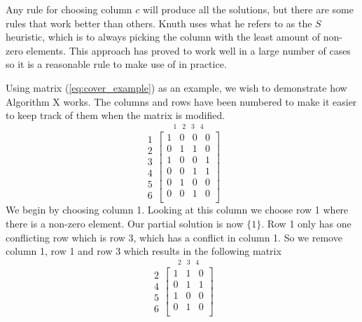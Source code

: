 Any rule for choosing column $c$ will produce all the solutions, but there are some rules that work better than others.
Knuth uses what he refers to as the $S$ heuristic, which is to always picking the column with the least amount of non-zero elements.
This approach has proved to work well in a large number of cases so it is a reasonable rule to make use of in practice.

Using matrix (\ref{eq:cover_example}) as an example, we wish to demonstrate how Algorithm X works.
The columns and rows have been numbered to make it easier to keep track of them when the matrix is modified.
\begin{equation}
	\label{eq:ces1}
	\begin{array}{r} 1\\ 2\\ 3\\ 4\\ 5\\ 6 \end{array}
	\stackrel{
		\begin{array}{cccc} 1 & 2 & 3 & 4 \end{array}
	}{
		\begin{bmatrix}
			1 & 0 & 0 & 0 \\
			0 & 1 & 1 & 0 \\
			1 & 0 & 0 & 1 \\
			0 & 0 & 1 & 1 \\
			0 & 1 & 0 & 0 \\
			0 & 0 & 1 & 0 \\
		\end{bmatrix}
	}
\end{equation}
We begin by choosing column 1.
Looking at this column we choose row 1 where there is a non-zero element.
Our partial solution is now $\{ 1 \}$.
Row 1 only has one conflicting row which is row 3, which has a conflict in column 1.
So we remove column 1, row 1 and row 3 which results in the following matrix
\begin{equation}
	\label{eq:ces2}
	\begin{array}{r} 2\\ 4\\ 5\\ 6 \end{array}
	\stackrel{
		\begin{array}{ccc} 2 & 3 & 4 \end{array}
	}{
		\begin{bmatrix}
			1 & 1 & 0 \\
			0 & 1 & 1 \\
			1 & 0 & 0 \\
			0 & 1 & 0 \\
		\end{bmatrix}
	}
\end{equation}
